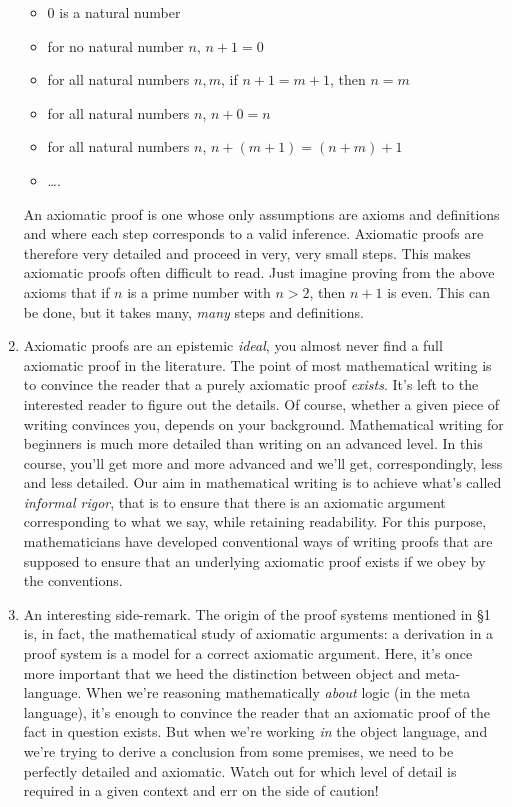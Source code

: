\begin{enumerate}[{\thesection}.1]
\begin{itemize}
		\item $0$ is a natural number
	
		\item for no natural number $n$, $n+1=0$
		
		\item for all natural numbers $n,m$, if $n+1=m+1$, then $n=m$
		
		\item for all natural numbers $n$, $n+0=n$
		
		\item for all natural numbers $n$, $n+(m+1)=(n+m)+1$
		
		\item \dots.
	
	\end{itemize}
	An axiomatic proof is one whose only assumptions are axioms and definitions and where each step corresponds to a valid inference. Axiomatic proofs are therefore very detailed and proceed in very, very small steps. This makes axiomatic proofs often difficult to read. Just imagine proving from the above axioms that if $n$ is a prime number with $n>2$, then $n+1$ is even. This can be done, but it takes many, \emph{many} steps and definitions.
	
	 \item Axiomatic proofs are an epistemic \emph{ideal}, you almost never find a full axiomatic proof in the literature. The point of most mathematical writing is to convince the reader that a purely axiomatic proof \emph{exists}. It's left to the interested reader to figure out the details. Of course, whether a given piece of writing convinces you, depends on your background. Mathematical writing for beginners is much more detailed than writing on an advanced level. In this course, you'll get more and more advanced and we'll get, correspondingly, less and less detailed. Our aim in mathematical writing is to achieve what's called \emph{informal rigor}, that is to ensure that there is an axiomatic argument corresponding to what we say, while retaining readability. For this purpose, mathematicians have developed conventional ways of writing proofs that are supposed to ensure that an underlying axiomatic proof exists if we obey by the conventions.
	 
	 \item An interesting side-remark. The origin of the proof systems mentioned in \S1 is, in fact, the mathematical study of axiomatic arguments: a derivation in a proof system is a model for a correct axiomatic argument. Here, it's once more important that we heed the distinction between object and meta-language. When we're reasoning mathematically \emph{about} logic (in the meta language), it's enough to convince the reader that an axiomatic proof of the fact in question exists. But when we're working \emph{in} the object language, and we're trying to derive a conclusion from some premises, we need to be perfectly detailed and axiomatic. Watch out for which level of detail is required in a given context and err on the side of caution!
	 

\end{enumerate}
